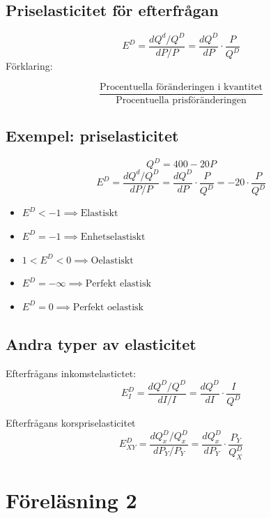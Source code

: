 \documentclass[12pt,a4paper]{article}
\begin{document}
\subsection*{Priselasticitet för efterfrågan}
{\large $$E^D = \frac{dQ^d / Q^D}{dP / P} = \frac{dQ^D}{dP} \cdot \frac{P}{Q^D}$$}
Förklaring: {\large $$\frac{\text{Procentuella föränderingen i kvantitet}}{\text{Procentuella prisföränderingen}}$$

\subsection*{Exempel: priselasticitet}
$$Q^D = 400 - 20P$$
\vspace{5pt}
$$E^D = \frac{dQ^d / Q^D}{dP / P} =\frac{dQ^D}{dP} \cdot \frac{P}{Q^D} = -20 \cdot \frac{P}{Q^D}$$
\begin{itemize}
    \item $E^D < -1 \implies \text{Elastiskt}$
    \item $E^D = -1 \implies \text{Enhetselastiskt}$
    \item $1 < E^D < 0 \implies \text{Oelastiskt}$
    \item $E^D = -\infty \implies \text{Perfekt elastisk}$
    \item $E^D = 0 \implies \text{Perfekt oelastisk}$
\end{itemize}

\subsection*{Andra typer av elasticitet}
Efterfrågans inkomstelastictet:
\vspace{10pt}
{\Large $$E^D_I = \frac{dQ^D / Q^D}{dI / I} = \frac{dQ^D}{dI} \cdot \frac{I}{Q^D}$$}

\noindent Efterfrågans korspriselasticitet
\vspace{10pt}
{\Large $$E^D_{XY} = \frac{dQ_x^D/Q^D_x}{dP_Y / P_Y} = \frac{dQ^D_x}{dP_Y} \cdot \frac{P_Y}{Q_X^D}$$}

\noindent{\Huge $\square$}

\newpage
\section*{Föreläsning 2}
}
\end{document}
